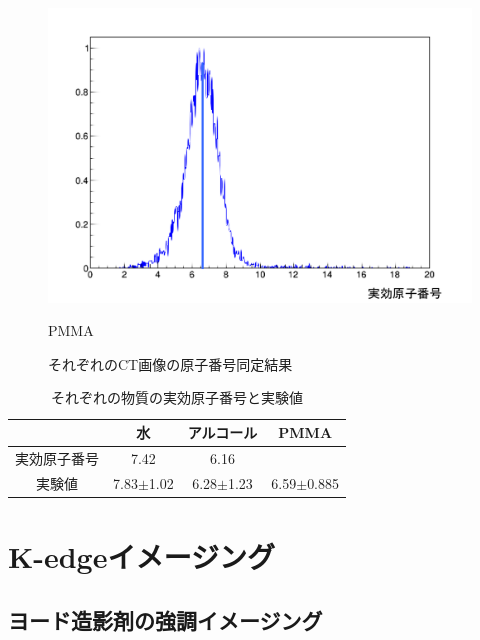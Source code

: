 \begin{figure}[H]
  \begin{minipage}{0.5\hsize}
  \begin{center}
   \includegraphics[bb=0.000000 0.000000 618.188896 429.564489,width=1.0\hsize]{image2/chapter5/Z_PMMA.png}
  \end{center}
\vspace{-1cm}
\caption*{PMMA}
 \end{minipage}
 \begin{center}
  \caption{それぞれのCT画像の原子番号同定結果}
  \label{fig:Z_identify}
  \end{center}
\end{figure}

\begin{table}[H]
  \centering
    \begin{tabular}{cccc}
    \toprule
          & 水     & アルコール & PMMA \\
    \midrule
    実効原子番号 & 7.42  & 6.16  &  \\
    実験値   & 7.83$\pm$1.02 & 6.28$\pm$1.23 & 6.59$\pm$0.885 \\
    \bottomrule
    \end{tabular}%
      \caption{それぞれの物質の実効原子番号と実験値}
  \label{tab:addlabel}%
\end{table}%


\section{K-edgeイメージング}

\subsection{ヨード造影剤の強調イメージング}

